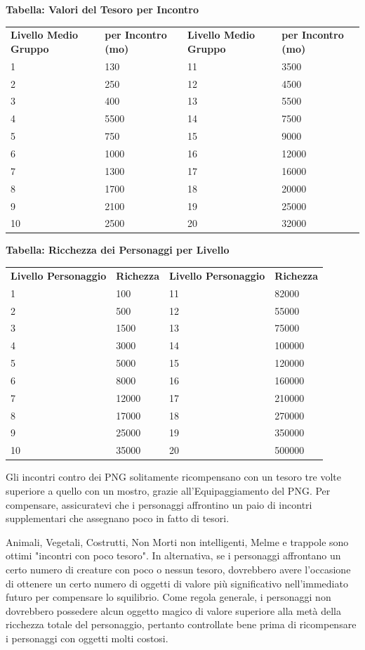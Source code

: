 \documentclass[a4paper,11pt,twoside,openany]{book}
\begin{document}
{\bigskip

\textbf{Tabella: Valori del Tesoro per Incontro}

\begin{tabular}{llll}
\toprule
\textbf{Livello Medio Gruppo} & \textbf{per Incontro (mo)} & \textbf{Livello Medio Gruppo} & \textbf{per Incontro (mo)}\tabularnewline
1 & 130 & 11 & 3500\tabularnewline
2 & 250 & 12 & 4500\tabularnewline
3 & 400 & 13 & 5500\tabularnewline
4 & 5500 & 14 & 7500\tabularnewline
5 & 750 & 15 & 9000\tabularnewline
6 & 1000 & 16 & 12000\tabularnewline
7 & 1300 & 17 & 16000\tabularnewline
8 & 1700 & 18 & 20000\tabularnewline
9 & 2100 & 19 & 25000\tabularnewline
10 & 2500 & 20 & 32000\tabularnewline
\end{tabular}
\bigskip

\textbf{Tabella: Ricchezza dei Personaggi per Livello}

\bigskip

\begin{tabular}{llll}
\toprule
\textbf{Livello Personaggio} & \textbf{Richezza} &\textbf{ Livello Personaggio} & \textbf{Richezza}\tabularnewline
1 & 100 & 11 & 82000\tabularnewline
2 & 500 & 12 & 55000\tabularnewline
3 & 1500 & 13 & 75000\tabularnewline
4 & 3000 & 14 & 100000\tabularnewline
5 & 5000 & 15 & 120000\tabularnewline
6 & 8000 & 16 & 160000\tabularnewline
7 & 12000 & 17 & 210000\tabularnewline
8 & 17000 & 18 & 270000\tabularnewline
9 & 25000 & 19 & 350000\tabularnewline
10 & 35000 & 20 & 500000\tabularnewline
\end{tabular}

\bigskip

Gli incontri contro dei PNG solitamente ricompensano con un tesoro
tre volte superiore a quello con un mostro, grazie all'Equipaggiamento
del PNG. Per compensare, assicuratevi che i personaggi affrontino
un paio di incontri supplementari che assegnano poco in fatto di tesori.

Animali, Vegetali, Costrutti, Non Morti non intelligenti, Melme e trappole sono ottimi "incontri con poco tesoro". In alternativa, se i personaggi affrontano un certo numero di creature con poco o nessun tesoro, dovrebbero avere l'occasione di ottenere un certo numero di oggetti di valore più significativo nell'immediato futuro per compensare lo squilibrio. Come regola generale, i personaggi non dovrebbero possedere alcun oggetto magico di valore superiore alla metà della ricchezza totale del personaggio, pertanto controllate bene prima di ricompensare i personaggi con oggetti molti costosi.

}
\end{document}

